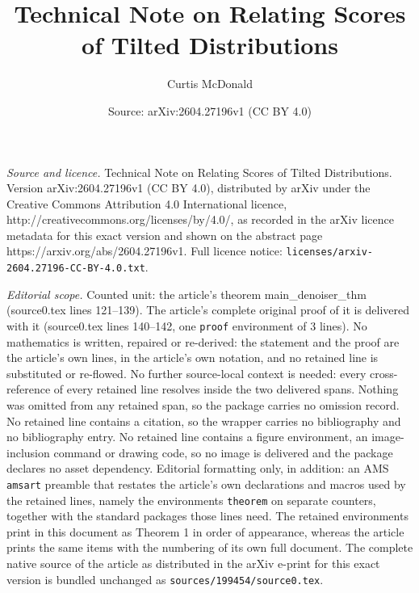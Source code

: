 \documentclass[10pt,a4paper]{amsart}
\title{Technical Note on Relating Scores of Tilted Distributions}
\author{Curtis McDonald}
\date{Source: arXiv:2604.27196v1 (CC BY 4.0)}
\begin{document}
\maketitle

\noindent\emph{Source and licence.} Technical Note on Relating Scores of Tilted Distributions. Version arXiv:2604.27196v1 (CC BY 4.0), distributed by arXiv under the Creative Commons Attribution 4.0 International licence, http://creativecommons.org/licenses/by/4.0/, as recorded in the arXiv licence metadata for this exact version and shown on the abstract page https://arxiv.org/abs/2604.27196v1. Full licence notice: \texttt{licenses/arxiv-2604.27196-CC-BY-4.0.txt}.\par\smallskip

\noindent\textit{Editorial scope.} Counted unit: the article's theorem main\_denoiser\_thm (source0.tex lines 121--139). The article's complete original proof of it is delivered with it (source0.tex lines 140--142, one \texttt{proof} environment of 3 lines). No mathematics is written, repaired or re-derived: the statement and the proof are the article's own lines, in the article's own notation, and no retained line is substituted or re-flowed.  No further source-local context is needed: every cross-reference of every retained line resolves inside the two delivered spans.  Nothing was omitted from any retained span, so the package carries no omission record.  No retained line contains a citation, so the wrapper carries no bibliography and no bibliography entry.  No retained line contains a figure environment, an image-inclusion command or drawing code, so no image is delivered and the package declares no asset dependency.  Editorial formatting only, in addition: an AMS \texttt{amsart} preamble that restates the article's own declarations and macros used by the retained lines, namely the environments \texttt{theorem} on separate counters, together with the standard packages those lines need.  The retained environments print in this document as Theorem 1 in order of appearance, whereas the article prints the same items with the numbering of its own full document.  The complete native source of the article as distributed in the arXiv e-print for this exact version is bundled unchanged as \texttt{sources/199454/source0.tex}.
\end{document}
